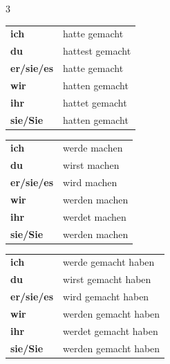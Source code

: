 \documentclass[a4paper,10pt]{article}
\begin{document}
\begin{multicols}{3}
        \begin{tcolorbox}[tensebox,title=Plusquamperfekt]
            \begin{tabular}{>{\bfseries}l l}
                ich       & hatte gemacht   \\
                du        & hattest gemacht \\
                er/sie/es & hatte gemacht   \\
                wir       & hatten gemacht  \\
                ihr       & hattet gemacht  \\
                sie/Sie   & hatten gemacht  \\
            \end{tabular}
        \end{tcolorbox}
        
        \begin{tcolorbox}[tensebox,title=Futur I]
            \begin{tabular}{>{\bfseries}l l}
                ich       & werde machen  \\
                du        & wirst machen  \\
                er/sie/es & wird machen   \\
                wir       & werden machen \\
                ihr       & werdet machen \\
                sie/Sie   & werden machen \\
            \end{tabular}
        \end{tcolorbox}
        
        \begin{tcolorbox}[tensebox,title=Futur II]
            \begin{tabular}{>{\bfseries}l l}
                ich       & werde gemacht haben  \\
                du        & wirst gemacht haben  \\
                er/sie/es & wird gemacht haben   \\
                wir       & werden gemacht haben \\
                ihr       & werdet gemacht haben \\
                sie/Sie   & werden gemacht haben \\
            \end{tabular}
        \end{tcolorbox}
        

\end{multicols}
\end{document}
